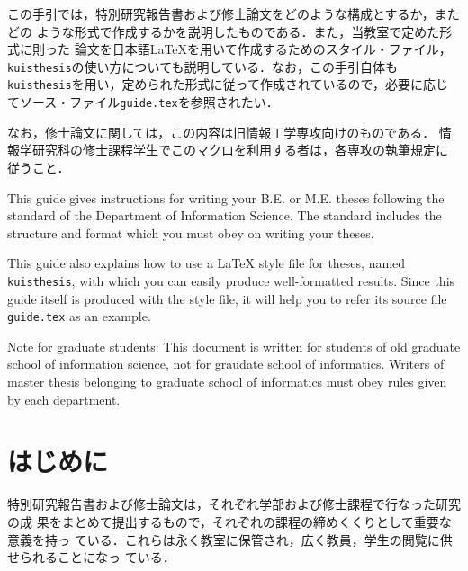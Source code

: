 \documentclass[master]{kuisthesis}		%
\date{令和1年6月13日}				%
\begin{document}
\maketitle					%

\begin{jabstract}				%
この手引では，特別研究報告書および修士論文をどのような構成とするか，またどの
ような形式で作成するかを説明したものである．また，当教室で定めた形式に則った
論文を日本語\LaTeX を用いて作成するためのスタイル・ファイル， 
\verb|kuisthesis|の使い方についても説明している．なお，この手引自体も
\verb|kuisthesis|を用い，定められた形式に従って作成されているので，必要に応じ
てソース・ファイル\verb|guide.tex|を参照されたい．

なお，修士論文に関しては，この内容は旧情報工学専攻向けのものである．
情報学研究科の修士課程学生でこのマクロを利用する者は，各専攻の執筆規定に
従うこと．
\end{jabstract}

\begin{eabstract}				%
This guide gives instructions for writing your B.E. or M.E. theses following
the standard of the Department of Information Science.  The
standard includes the structure and format which you must obey on writing
your theses.

This guide also explains how to use a \LaTeX{} style file for theses, named
\verb|kuisthesis|, with which you can easily produce well-formatted results.
Since this guide itself is produced with the style file, it will help you to
refer its source file \verb|guide.tex| as an example.

Note for graduate students: This document is written for students of
old graduate school of information science, not for graudate school of
informatics. Writers of master thesis belonging to graduate school
of informatics must obey rules given by each department.

\end{eabstract}

\tableofcontents				%

\section{はじめに}\label{sec-intro}		%
特別研究報告書および修士論文は，それぞれ学部および修士課程で行なった研究の成
果をまとめて提出するもので，それぞれの課程の締めくくりとして重要な意義を持っ
ている．これらは永く教室に保管され，広く教員，学生の閲覧に供せられることになっ
ている．
\end{document}
